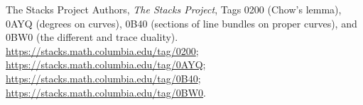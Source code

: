 The Stacks Project Authors,
\emph{The Stacks Project},
Tags 0200 (Chow's lemma), 0AYQ (degrees on curves),
0B40 (sections of line bundles on proper curves),
and 0BW0 (the different and trace duality).
\url{https://stacks.math.columbia.edu/tag/0200};
\url{https://stacks.math.columbia.edu/tag/0AYQ};
\url{https://stacks.math.columbia.edu/tag/0B40};
\url{https://stacks.math.columbia.edu/tag/0BW0}.
